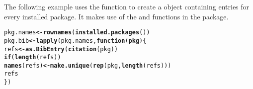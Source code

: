\documentclass[article]{jss}\usepackage[]{graphicx}\usepackage[]{color}
\makeatletter
\newcommand{\hlstd}[1]{\textcolor[rgb]{0.251,0.251,0.282}{#1}}%
\newcommand{\hlkwa}[1]{\textcolor[rgb]{0,0.533,0.345}{\textbf{#1}}}%
\newcommand{\hlkwb}[1]{\textcolor[rgb]{0.439,0.251,1}{\textbf{#1}}}%
\newcommand{\hlkwc}[1]{\textcolor[rgb]{0.529,0,0.184}{\textbf{#1}}}%
\newcommand{\hlkwd}[1]{\textcolor[rgb]{0.251,0.251,0.282}{\textbf{#1}}}%
\newenvironment{kframe}{%
 \def\at@end@of@kframe{}%
 \ifinner\ifhmode%
  \def\at@end@of@kframe{\end{minipage}}%
  \begin{minipage}{\columnwidth}%
 \fi\fi%
 \def\FrameCommand##1{\hskip\@totalleftmargin \hskip-\fboxsep
 \colorbox{shadecolor}{##1}\hskip-\fboxsep
     \hskip-\linewidth \hskip-\@totalleftmargin \hskip\columnwidth}%
 \MakeFramed {\advance\hsize-\width
   \@totalleftmargin\z@ \linewidth\hsize
   \@setminipage}}%
 {\par\unskip\endMakeFramed%
 \at@end@of@kframe}
\newenvironment{knitrout}{}{} %
\makeatother
\begin{document}
The following example uses the function to create a  object containing entries for every installed \R{} package.  It makes use of the  and  functions in the  package.
\begin{knitrout}
\color{fgcolor}\begin{kframe}
\begin{alltt}
\hlstd{pkg.names} \hlkwb{<-} \hlkwd{rownames}\hlstd{(}\hlkwd{installed.packages}\hlstd{())}
\hlstd{pkg.bib} \hlkwb{<-} \hlkwd{lapply}\hlstd{(pkg.names,} \hlkwa{function}\hlstd{(}\hlkwc{pkg}\hlstd{)\{}
  \hlstd{refs} \hlkwb{<-} \hlkwd{as.BibEntry}\hlstd{(}\hlkwd{citation}\hlstd{(pkg))}
  \hlkwa{if} \hlstd{(}\hlkwd{length}\hlstd{(refs))}
    \hlkwd{names}\hlstd{(refs)} \hlkwb{<-} \hlkwd{make.unique}\hlstd{(}\hlkwd{rep}\hlstd{(pkg,} \hlkwd{length}\hlstd{(refs)))}
  \hlstd{refs}
\hlstd{\})}
\end{alltt}
\end{kframe}
\end{knitrout}
\end{document}
